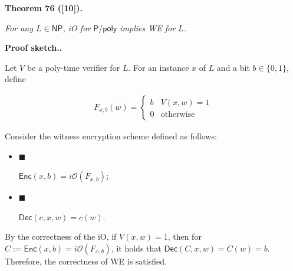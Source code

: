 \documentclass[10pt,a4paper]{article}
\begin{document}




\par\medskip\noindent\textbf{
\textbf{Theorem 76}\textbf{ }([10])\textbf{.}
}\par



\emph{For any $L\in{\mathsf{NP}}$, iO for ${\mathsf{P}}/{\mathsf{poly}}$ implies WE for $L$.}\par






\par\medskip\noindent\textbf{Proof sketch..}\par




Let $V$ be a poly-time verifier for $L$. For an instance $x$ of $L$ and a bit $b\in\{0,1\}$, define\par


\[\begin{gathered}
F_{x,b}(w)=\begin{cases}b&V(x,w)=1\\
0&\text{otherwise}\end{cases}
\end{gathered}\]


Consider the witness encryption scheme defined as follows:\par


\begin{itemize}


\item[] 
$\blacksquare$ 


${\mathsf{Enc}}(x,b)=i\mathcal{O}(F_{x,b})$;\par





\item[] 
$\blacksquare$ 


${\mathsf{Dec}}(c,x,w)=c(w)$.\par





\end{itemize}


By the correctness of the iO, if $V(x,w)=1$, then for $C:={\mathsf{Enc}}(x,b)=i\mathcal{O}(F_{x,b})$, it holds that ${\mathsf{Dec}}(C,x,w)=C(w)=b$. Therefore, the correctness of WE is satisfied.\par
\end{document}
